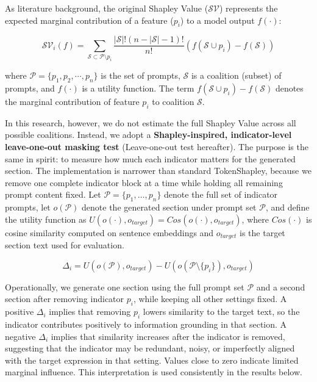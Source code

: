 As literature background, the original Shapley Value ($\mathcal{SV}$) represents the expected marginal contribution of a feature ($p_i$) to a model output $f(\cdot)$:

\begin{equation*}
  \mathcal{SV}_i(f) = \sum_{\mathcal{S} \subset \mathcal{P}\setminus p_i} \frac{\left|\mathcal{S}\right|! (n - \left|\mathcal{S}\right| - 1)!}{n!} \left(f(\mathcal{S}\cup p_i) - f(\mathcal{S})\right)
\end{equation*}

where $\mathcal{P}=\{p_1, p_2, \cdots, p_n\}$ is the set of prompts, $\mathcal{S}$ is a coalition (subset) of prompts, and $f(\cdot)$ is a utility function. The term $f(\mathcal{S}\cup p_i)-f(\mathcal{S})$ denotes the marginal contribution of feature $p_i$ to coalition $\mathcal{S}$.


In this research, however, we do not estimate the full Shapley Value across all possible coalitions. Instead, we adopt a \textbf{Shapley-inspired, indicator-level leave-one-out masking test} (Leave-one-out test hereafter). The purpose is the same in spirit: to measure how much each indicator matters for the generated section. The implementation is narrower than standard TokenShapley, because we remove one complete indicator block at a time while holding all remaining prompt content fixed. Let $\mathcal{P}=\{p_1,\ldots,p_n\}$ denote the full set of indicator prompts, let $o(\mathcal{P})$ denote the generated section under prompt set $\mathcal{P}$, and define the utility function as $U(o(\cdot),o_{target}) = Cos(o(\cdot),o_{target})$, where $Cos(\cdot)$ is cosine similarity computed on sentence embeddings and $o_{target}$ is the target section text used for evaluation.


\begin{equation}\label{eq:ch2:shapley}
    \Delta_i = U(o(\mathcal{P}), o_{target}) - U(o(\mathcal{P}\setminus\{p_i\}), o_{target})
\end{equation}

Operationally, we generate one section using the full prompt set $\mathcal{P}$ and a second section after removing indicator $p_i$, while keeping all other settings fixed. A positive $\Delta_i$ implies that removing $p_i$ lowers similarity to the target text, so the indicator contributes positively to information grounding in that section. A negative $\Delta_i$ implies that similarity increases after the indicator is removed, suggesting that the indicator may be redundant, noisy, or imperfectly aligned with the target expression in that setting. Values close to zero indicate limited marginal influence. This interpretation is used consistently in the results below.


